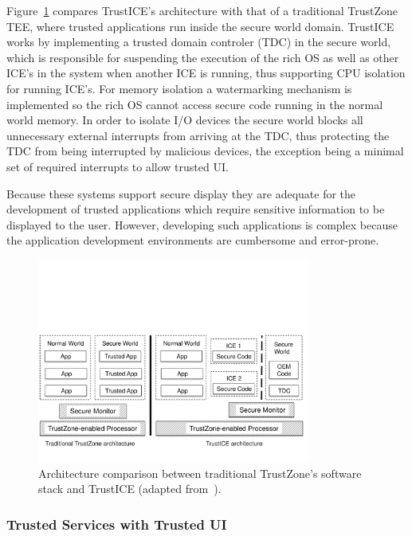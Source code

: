 Figure~\ref{fig:trustICE_architecture} compares TrustICE's architecture with that of a traditional TrustZone TEE, where trusted applications run inside the secure world domain. TrustICE works by implementing a trusted domain controler (TDC) in the secure world, which is responsible for suspending the execution of the rich OS as well as other ICE's in the system when another ICE is running, thus supporting CPU isolation for running ICE's. For memory isolation a watermarking mechanism is implemented so the rich OS cannot access secure code running in the normal world memory. In order to isolate I/O devices the secure world blocks all unnecessary external interrupts from arriving at the TDC, thus protecting the TDC from being interrupted by malicious devices, the exception being a minimal set of required interrupts to allow trusted UI.

Because these systems support secure display they are adequate for the development of trusted applications which require sensitive information to be displayed to the user. However, developing such applications is complex because the application development environments are cumbersome and error-prone.

\begin{figure}[t!]
	\centering
	\includegraphics[width=0.80\textwidth]{img/trustICE.pdf}
	\caption{Architecture comparison between traditional TrustZone's software stack and TrustICE (adapted from~\cite{sun2015trustice}).}
	\label{fig:trustICE_architecture}
\end{figure}

\subsubsection{Trusted Services with Trusted UI}

